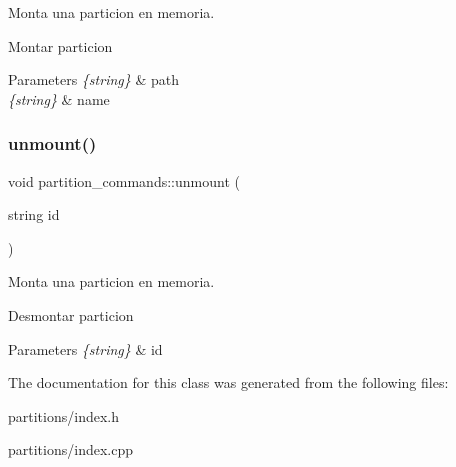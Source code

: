 Monta una particion en memoria. 

Montar particion 
\begin{DoxyParams}{Parameters}
{\em \{string\}} & path \\
\hline
{\em \{string\}} & name \\
\hline
\end{DoxyParams}
\mbox{\label{classpartition__commands_a5caa41608c247eb70a6ea8120850924d}} 
\subsubsection{\texorpdfstring{unmount()}{unmount()}}
{\footnotesize\ttfamily void partition\+\_\+commands\+::unmount (\begin{DoxyParamCaption}\item[{string}]{id }\end{DoxyParamCaption})}



Monta una particion en memoria. 

Desmontar particion 
\begin{DoxyParams}{Parameters}
{\em \{string\}} & id \\
\hline
\end{DoxyParams}


The documentation for this class was generated from the following files\+:\begin{DoxyCompactItemize}
\item 
partitions/index.\+h\item 
partitions/index.\+cpp\end{DoxyCompactItemize}
